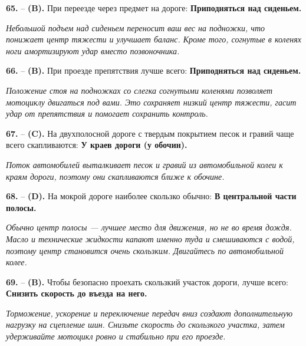 \begin{minipage}{\linewidth}
\noindent\textbf{65.}  -- \textbf {(B).} При переезде через предмет на дороге:  \textbf {Приподняться над сиденьем.} \par \textit {Небольшой подъем над сиденьем переносит ваш вес на подножки, что понижает центр тяжести и улучшает баланс. Кроме того, согнутые в коленях ноги амортизируют удар вместо позвоночника.} \\
\end{minipage}

\begin{minipage}{\linewidth}
\noindent\textbf{66.}  -- \textbf {(B).} При проезде препятствия лучше всего:  \textbf {Приподняться над сиденьем.} \par \textit {Положение стоя на подножках со слегка согнутыми коленями позволяет мотоциклу двигаться под вами. Это сохраняет низкий центр тяжести, гасит удар от препятствия и помогает сохранить контроль.} \\
\end{minipage}

\begin{minipage}{\linewidth}
\noindent\textbf{67.}  -- \textbf {(C).} На двухполосной дороге с твердым покрытием песок и гравий чаще всего скапливаются:  \textbf {У краев дороги (у обочин).} \par \textit {Поток автомобилей выталкивает песок и гравий из автомобильной колеи к краям дороги, поэтому они скапливаются ближе к обочине.} \\
\end{minipage}

\begin{minipage}{\linewidth}
\noindent\textbf{68.}  -- \textbf {(D).} На мокрой дороге наиболее скользко обычно:  \textbf {В центральной части полосы.} \par \textit {Обычно центр полосы — лучшее место для движения, но не во время дождя. Масло и технические жидкости капают именно туда и смешиваются с водой, поэтому центр становится очень скользким. Двигайтесь по автомобильной колее.} \\
\end{minipage}

\begin{minipage}{\linewidth}
\noindent\textbf{69.}  -- \textbf {(B).} Чтобы безопасно проехать скользкий участок дороги, лучше всего:  \textbf {Снизить скорость до въезда на него.} \par \textit {Торможение, ускорение и переключение передач вниз создают дополнительную нагрузку на сцепление шин. Снизьте скорость до скользкого участка, затем удерживайте мотоцикл ровно и стабильно при его проезде.} \\
\end{minipage}

